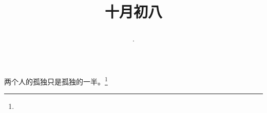 \title{\date[d=8,m=11,y=2024][year:cn-y,年,month:cn,day:cn,日,·,weekday]·十月初八 }
两个人的孤独只是孤独的一半。\footnote{ }

